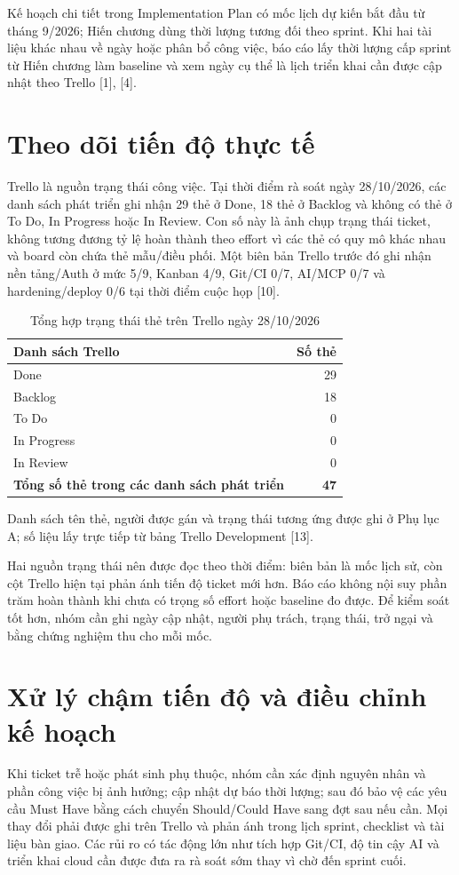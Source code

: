 \documentclass[12pt,a4paper]{report}
\begin{document}
Kế hoạch chi tiết trong Implementation Plan có mốc lịch dự kiến bắt đầu từ tháng 9/2026; Hiến chương dùng thời lượng tương đối theo sprint. Khi hai tài liệu khác nhau về ngày hoặc phân bổ công việc, báo cáo lấy thời lượng cấp sprint từ Hiến chương làm baseline và xem ngày cụ thể là lịch triển khai cần được cập nhật theo Trello [1], [4].

\section{Theo dõi tiến độ thực tế}
Trello là nguồn trạng thái công việc. Tại thời điểm rà soát ngày 28/10/2026, các danh sách phát triển ghi nhận 29 thẻ ở Done, 18 thẻ ở Backlog và không có thẻ ở To Do, In Progress hoặc In Review. Con số này là ảnh chụp trạng thái ticket, không tương đương tỷ lệ hoàn thành theo effort vì các thẻ có quy mô khác nhau và board còn chứa thẻ mẫu/điều phối. Một biên bản Trello trước đó ghi nhận nền tảng/Auth ở mức 5/9, Kanban 4/9, Git/CI 0/7, AI/MCP 0/7 và hardening/deploy 0/6 tại thời điểm cuộc họp [10].

\begin{table}[H]
\centering
\caption{Tổng hợp trạng thái thẻ trên Trello ngày 28/10/2026}
\begin{tabular}{|l|r|}
\hline
\textbf{Danh sách Trello} & \textbf{Số thẻ} \\
\hline
Done & 29 \\
Backlog & 18 \\
To Do & 0 \\
In Progress & 0 \\
In Review & 0 \\
\hline
\textbf{Tổng số thẻ trong các danh sách phát triển} & \textbf{47} \\
\hline
\end{tabular}
\end{table}
Danh sách tên thẻ, người được gán và trạng thái tương ứng được ghi ở Phụ lục A; số liệu lấy trực tiếp từ bảng Trello Development [13].

Hai nguồn trạng thái nên được đọc theo thời điểm: biên bản là mốc lịch sử, còn cột Trello hiện tại phản ánh tiến độ ticket mới hơn. Báo cáo không nội suy phần trăm hoàn thành khi chưa có trọng số effort hoặc baseline đo được. Để kiểm soát tốt hơn, nhóm cần ghi ngày cập nhật, người phụ trách, trạng thái, trở ngại và bằng chứng nghiệm thu cho mỗi mốc.

\section{Xử lý chậm tiến độ và điều chỉnh kế hoạch}
Khi ticket trễ hoặc phát sinh phụ thuộc, nhóm cần xác định nguyên nhân và phần công việc bị ảnh hưởng; cập nhật dự báo thời lượng; sau đó bảo vệ các yêu cầu Must Have bằng cách chuyển Should/Could Have sang đợt sau nếu cần. Mọi thay đổi phải được ghi trên Trello và phản ánh trong lịch sprint, checklist và tài liệu bàn giao. Các rủi ro có tác động lớn như tích hợp Git/CI, độ tin cậy AI và triển khai cloud cần được đưa ra rà soát sớm thay vì chờ đến sprint cuối.
\end{document}
